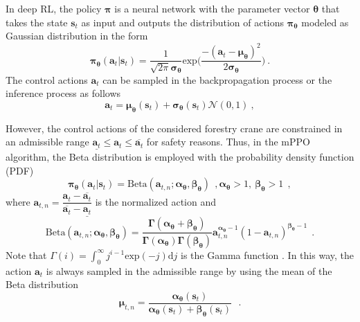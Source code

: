 In deep RL, the policy $\bm{\pi}$ is a neural network with the parameter vector $\bm{\theta}$ that takes the state $\mathbf{s}_t$ as input and outputs the distribution of actions $\bm{\pi_{\theta}}$ modeled as Gaussian distribution in the form
\begin{equation}
    \bm{\pi_{\theta}}(\mathbf{a}_t|\mathbf{s}_t) = \dfrac{1}{\sqrt{2\pi}\bm{\sigma_\theta}}\mathrm{exp}
    \Bigg(
    \dfrac{-(\mathbf{a}_t-\bm{\mu_\theta})^2}{2\bm{\sigma_\theta}}
    \Bigg)\:.
\end{equation}
The control actions $\mathbf{a}_t$ can be sampled in the backpropagation process or the inference process as follows
\begin{equation}
    \mathbf{a}_t = \bm{\mu_\theta}(\mathbf{s}_t) + \bm{\sigma_\theta}(\mathbf{s}_t)\mathcal{N}(0,1)   \:,
\end{equation}

However, the control actions of the considered forestry crane are constrained in an admissible range $\underline{\mathbf{a}_t} \leq \mathbf{a}_t \leq \overline{\mathbf{a}_t}$ for safety reasons. Thus, in the mPPO algorithm, the Beta distribution is employed with the probability density function (PDF) \cite{chou2017improving}
\begin{equation}
    \bm{\pi_\theta}(\mathbf{a}_t|\mathbf{s}_t) = \bm{\mathrm{Beta}}(\mathbf{a}_{t,n};\bm{\alpha_\theta},\bm{\beta_\theta})\:\:, \bm{\alpha_\theta}>1, \:\bm{\beta_\theta} >1 \:\:,
\end{equation}
where $\mathbf{a}_{t,n} = \dfrac{\mathbf{a}_t- \overline{\mathbf{a}_t}}{\overline{\mathbf{a}_t} - \underline{\mathbf{a}_t}}$ is the normalized action and 
\begin{equation}
    \bm{\mathrm{Beta}}(\mathbf{a}_{t,n};\bm{\alpha_\theta},\bm{\beta_\theta}) = \dfrac{\bm{\Gamma}(\bm{\alpha_\theta}+\bm{\beta_\theta})}{\bm{\Gamma}(\bm{\alpha_\theta})\bm{\Gamma}(\bm{\beta_\theta})}\mathbf{a}_{t,n}^{\bm{\alpha_\theta}-1}(1-\mathbf{a}_{t,n})^{\bm{\beta_\theta}-1}\:\:. 
\end{equation}
Note that ${\Gamma}(i) = \int_0^\infty j^{i-1}\mathrm{exp}(-j)\mathrm{d}j$ is the Gamma function \cite{davis1959leonhard}. In this way, the action $\mathbf{a}_t$ is always sampled in the admissible range by using the mean of the Beta distribution 
\begin{equation}
    \bm{\mu}_{t,n} = \dfrac{\bm{\alpha_\theta}(\mathbf{s}_t)}{\bm{\alpha_\theta}(\mathbf{s}_t) + \bm{\beta_\theta}(\mathbf{s}_t)} \:\:\:. 
    \label{eq: sampling}
\end{equation}

